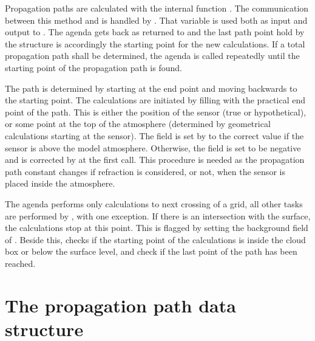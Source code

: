 Propagation paths are calculated with the internal function
. The communication between this method and
 is handled by .
That variable is used both as input and output to
.  The agenda gets back
 as returned to  and the
last path point hold by the structure is accordingly the starting
point for the new calculations. If a total propagation path shall be
determined, the agenda is called repeatedly until the starting point
of the propagation path is found. 

The path is determined by starting at the end point and moving
backwards to the starting point. The calculations are initiated by
filling  with the practical end point of the
path. This is either the position of the sensor (true or
hypothetical), or some point at the top of the atmosphere (determined
by geometrical calculations starting at the sensor).
The field  is set by 
to the correct value if the sensor is above the model atmosphere.
Otherwise, the field is set to be negative and is corrected by
 at the first call. This procedure is
needed as the propagation path constant changes if refraction is
considered, or not, when the sensor is placed inside the atmosphere.

The agenda performs only calculations to next crossing of a grid, all
other tasks are performed by , with one exception.
If there is an intersection with the surface, the calculations stop at
this point. This is flagged by setting the background field of
. Beside this,  checks if
the starting point of the calculations is inside the cloud box or
below the surface level, and check if the last point of the path has
been reached. 




\section{The propagation path data structure}
\label{sec:ppath:Ppath}

